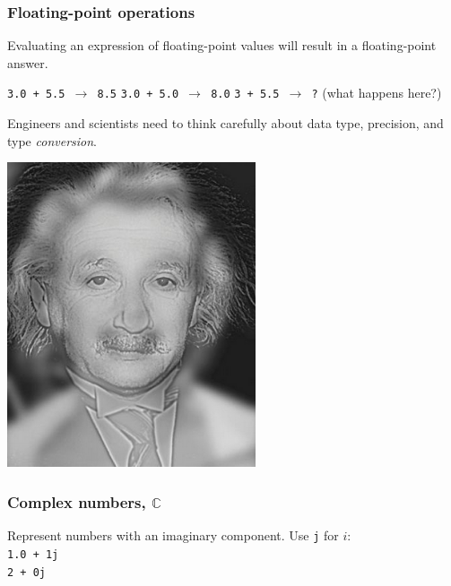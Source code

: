 \documentclass[11pt]{beamer}
\begin{document}
\begin{frame}
  \frametitle{Floating-point operations}
  \Enlarge

  \begin{itemize}
  \myitem  Evaluating an expression of floating-point values will result in a floating-point answer. \pause
    \begin{itemize}
    \mysubitem  \texttt{3.0 + 5.5 $\rightarrow$ 8.5} \pause
    \mysubitem  \texttt{3.0 + 5.0 $\rightarrow$ 8.0} \pause
    \mysubitem  \texttt{3   + 5.5 $\rightarrow$ ?} (what happens here?)
    \end{itemize} \pause
  \myitem  Engineers and scientists need to think carefully about data type, precision, and type \emph{conversion}.
  \end{itemize}
\end{frame}


\begin{frame}
  \begin{center}
  \vspace{3mm}
  \includegraphics[width=0.55\textwidth]{./img/monroeeinstein.png}
  \end{center}
\end{frame}


\iffalse
\begin{frame}
  \frametitle{Complex numbers, $\mathbb{C}$}
  \Enlarge

  \begin{itemize}
  \myitem  Represent numbers with an imaginary component. \pause
  \myitem  Use \texttt{j} for $i$: \\
    \textcolor{CS101GradBot}{\texttt{1.0 + 1j}} \\
    \textcolor{CS101GradBot}{\texttt{2 + 0j}} 
  \end{itemize}
\end{frame}
\end{document}
